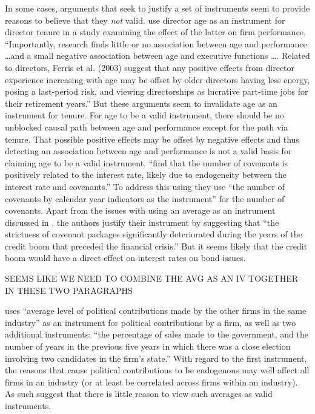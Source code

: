 \documentclass[11pt]{amsart}
\begin{document}
In some cases, arguments that seek to justify a set of instruments seem to provide reasons to believe that they \emph{not} valid. \citet{Kim:2014fm} use director age as an instrument for director tenure in a study examining the effect of the latter on firm performance. 
``Importantly, research finds little or no association between age and performance \dots and a small negative association between age and executive functions \dots. 
Related to directors, Ferris et al. (2003) suggest that any positive effects from director experience increasing with age may be offset by older directors having less energy, posing a last-period risk, and viewing directorships as lucrative part-time jobs for their retirement years.'' 
But these arguments seem to invalidate age as an instrument for tenure. 
For age to be a valid instrument, there should be no unblocked causal path between age and performance except for the path via tenure.
 That possible positive effects may be offset by negative effects and thus detecting an association between age and performance is not a valid basis for claiming age to be a valid instrument. \citet{deFranco:2014ct} ``find that the number of covenants is positively related to the interest rate, likely due to endogeneity between the interest rate and covenants.'' To address this using they use ``the number of covenants by calendar year indicators as the instrument'' for the number of covenants. Apart from the issues with using an average as an instrument discussed in \citet{Reiss:2007ej}, the authors justify their instrument by suggesting that ``the strictness of covenant packages significantly deteriorated during the years of the credit boom that preceded the financial crisis.'' But it seems likely that the credit boom would have a direct effect on interest rates on bond issues. 

SEEMS LIKE WE NEED TO COMBINE THE AVG AS AN IV TOGETHER IN THESE TWO PARAGRAPHS

\citet{Correia:2014fp} uses ``average level of political contributions made by the other firms in the same industry'' as an instrument for political contributions by a firm, as well as two additional instruments: ``the percentage of sales made to the government, and the number of years in the previous five years in which there was a close election involving two candidates in the firm's state.'' With regard to the first instrument, the reasons that cause political contributions to be endogenous may well affect all firms in an industry (or at least be correlated across firms within an industry). 
As such \citet{Reiss:2007ej} suggest that there is little reason to view such averages as valid instruments.
\end{document}
